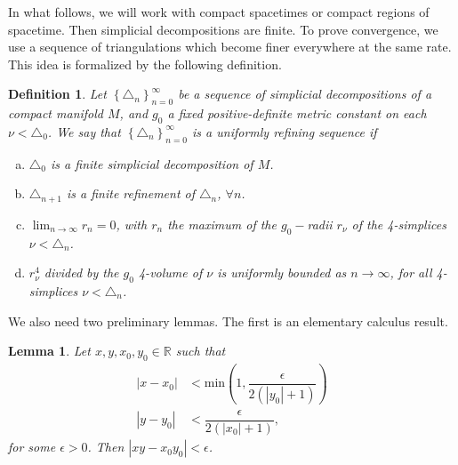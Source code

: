 \documentclass{article}
\newtheorem{lemma}{Lemma}
\newtheorem{definition}{Definition}
\begin{document}
In what follows, we will work with compact spacetimes or compact regions of spacetime. Then simplicial decompositions are finite. To prove convergence, we use a sequence of triangulations which become finer everywhere at the same rate. This idea is formalized by the following definition. 
\begin{definition}\label{unif}
	Let $\left\{\triangle_n\right\}_{n=0}^{\infty}$ be a sequence of simplicial decompositions of a compact manifold $M$, and $g_0$ a fixed positive-definite metric constant on each $\nu<\triangle_0$. We say that $\left\{\triangle_n\right\}_{n=0}^{\infty}$ is a uniformly refining sequence if 
	\begin{enumerate}[a)]
		\item $\triangle_0$ is a finite simplicial decomposition of $M$.
		\item $\triangle_{n+1}$ is a finite refinement of $\triangle_{n}$, $\forall n$.
		\item $\lim_{n\rightarrow\infty}r_n=0$, with $r_n$ the maximum of the $g_0-$radii $r_\nu$ of the 4-simplices $\nu<\triangle_n$.
		\item $r_{\nu}^{4}$ divided by the $g_0$ 4-volume of $\nu$ is uniformly bounded as $n\rightarrow\infty$, for all 4-simplices $\nu<\triangle_{n}$.
	\end{enumerate}	 
\end{definition}

We also need two preliminary lemmas. The first is an elementary calculus result.
\begin{lemma}\label{lemma1}
	Let $x,y,x_0,y_0\in\mathbb{R}$ such that 
	\begin{align*}
		\left|x-x_0\right|&<\text{min}\left(1,\dfrac{\epsilon}{2\left(\left|y_0\right|+1\right)}\right)\\
		\left|y-y_0\right|&<\dfrac{\epsilon}{2\left(\left|x_0\right|+1\right)},
	\end{align*}
	for some $\epsilon>0$. Then $\left|xy-x_0y_0\right|<\epsilon$.	
\end{lemma}	
\end{document}
